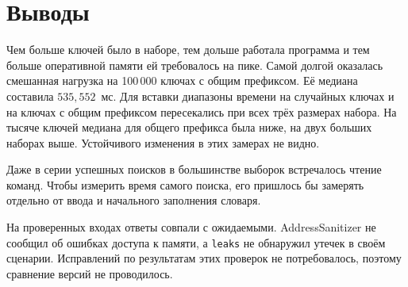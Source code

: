 \section{Выводы}
\begingroup
\raggedright

Чем больше ключей было в наборе, тем дольше работала программа и тем больше оперативной памяти ей требовалось на пике. Самой долгой оказалась смешанная нагрузка на 100\,000 ключах с общим префиксом. Её медиана составила \(535{,}552\)~мс. Для вставки диапазоны времени на случайных ключах и на ключах с общим префиксом пересекались при всех трёх размерах набора. На тысяче ключей медиана для общего префикса была ниже, на двух больших наборах выше. Устойчивого изменения в этих замерах не видно.

Даже в серии успешных поисков в большинстве выборок встречалось чтение команд. Чтобы измерить время самого поиска, его пришлось бы замерять отдельно от ввода и начального заполнения словаря.

На проверенных входах ответы совпали с ожидаемыми. AddressSanitizer не сообщил об ошибках доступа к памяти, а \texttt{leaks} не обнаружил утечек в своём сценарии. Исправлений по результатам этих проверок не потребовалось, поэтому сравнение версий не проводилось.
\par
\endgroup
